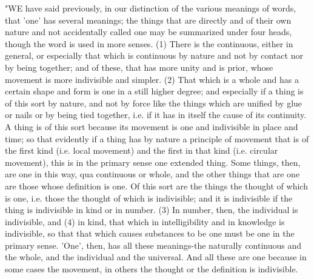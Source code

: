 "WE have said previously, in our distinction of the various meanings
of words, that 'one' has several meanings; the things that are directly
and of their own nature and not accidentally called one may be summarized
under four heads, though the word is used in more senses. (1) There
is the continuous, either in general, or especially that which is
continuous by nature and not by contact nor by being together; and
of these, that has more unity and is prior, whose movement is more
indivisible and simpler. (2) That which is a whole and has a certain
shape and form is one in a still higher degree; and especially if
a thing is of this sort by nature, and not by force like the things
which are unified by glue or nails or by being tied together, i.e.
if it has in itself the cause of its continuity. A thing is of this
sort because its movement is one and indivisible in place and time;
so that evidently if a thing has by nature a principle of movement
that is of the first kind (i.e. local movement) and the first in that
kind (i.e. circular movement), this is in the primary sense one extended
thing. Some things, then, are one in this way, qua continuous or whole,
and the other things that are one are those whose definition is one.
Of this sort are the things the thought of which is one, i.e. those
the thought of which is indivisible; and it is indivisible if the
thing is indivisible in kind or in number. (3) In number, then, the
individual is indivisible, and (4) in kind, that which in intelligibility
and in knowledge is indivisible, so that that which causes substances
to be one must be one in the primary sense. 'One', then, has all these
meanings-the naturally continuous and the whole, and the individual
and the universal. And all these are one because in some cases the
movement, in others the thought or the definition is indivisible.


